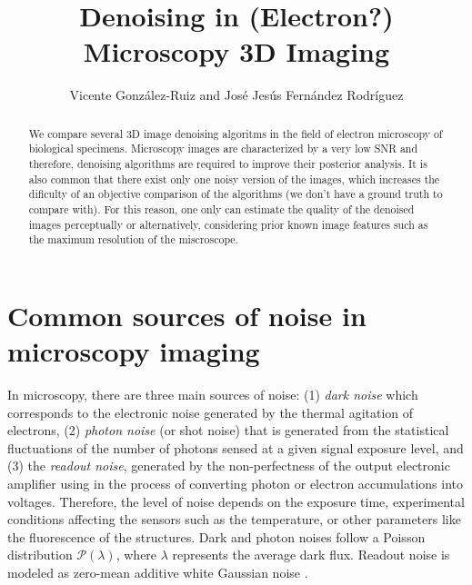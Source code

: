 \documentclass{article}
\title{Denoising in (Electron?) Microscopy 3D Imaging}
\author{Vicente González-Ruiz and José Jesús Fernández Rodríguez}
\begin{document}
\maketitle

\begin{abstract}
  We compare several 3D image denoising algoritms in the field of
  electron microscopy of biological specimens. Microscopy images are
  characterized by a very low SNR and therefore, denoising algorithms
  are required to improve their posterior analysis. It is also common
  that there exist only one noisy version of the images, which
  increases the dificulty of an objective comparison of the algorithms
  (we don't have a ground truth to compare with). For this reason, one
  only can estimate the quality of the denoised images perceptually or
  alternatively, considering prior known image features such as the
  maximum resolution of the miscroscope.
\end{abstract}

\tableofcontents

\section{Common sources of noise in microscopy imaging}

In microscopy, there are three main sources of noise: (1)
\emph{dark noise} which corresponds to the electronic noise generated
by the thermal agitation of electrons, (2) \emph{photon noise} (or
shot noise) that is generated from the statistical fluctuations of the
number of photons sensed at a given signal exposure level, and (3) the
\emph{readout noise}, generated by the non-perfectness of the output
electronic amplifier using in the process of converting photon or
electron accumulations into voltages. Therefore, the level of noise
depends on the exposure time, experimental conditions affecting the
sensors such as the temperature, or other parameters like the
fluorescence of the structures. Dark and photon noises follow a Poisson
distribution $\mathcal{P}(\lambda)$, where $\lambda$ represents the
average dark flux. Readout noise is modeled as zero-mean additive
white Gaussian noise \cite{meiniel2018denoising,zhou2020wirtinger}.
\end{document}
